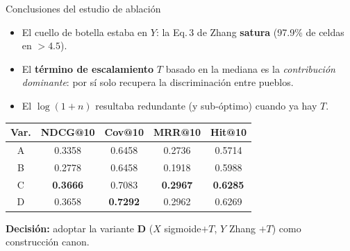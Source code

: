 \documentclass[aspectratio=169,11pt]{beamer}
\begin{document}
\begin{frame}{Conclusiones del estudio de ablaci\'on}
	\small
	\begin{itemize}\setlength\itemsep{4pt}
		\item El cuello de botella estaba en $Y$: la Eq.\,3 de Zhang \textbf{satura} (97.9\% de celdas en $\!>\!4.5$).
		\item El \textbf{t\'ermino de escalamiento} $T$ basado en la mediana es la \emph{contribuci\'on dominante}: por s\'i solo recupera la discriminaci\'on entre pueblos.
		\item El $\log(1+n)$ resultaba redundante (y sub-\'optimo) cuando ya hay $T$.
	\end{itemize}

	\vspace{0.6em}
	\centering
	\renewcommand{\arraystretch}{1.1}
	\begin{tabular}{c c c c c}
		\toprule
		\textbf{Var.} & NDCG@10         & Cov@10          & MRR@10          & Hit@10          \\
		\midrule
		A             & 0.3358          & 0.6458          & 0.2736          & 0.5714          \\
		B             & 0.2778          & 0.6458          & 0.1918          & 0.5988          \\
		\rowcolor{cream!50}
		C             & \textbf{0.3666} & 0.7083          & \textbf{0.2967} & \textbf{0.6285} \\
		\rowcolor{cream!50}
		D             & 0.3658          & \textbf{0.7292} & 0.2962          & 0.6269          \\
		\bottomrule
	\end{tabular}

	\vspace{0.5em}
	\textbf{Decisi\'on:} adoptar la variante \textbf{D} ($X$ sigmoide$+T$, $Y$ Zhang $+T$) como construcci\'on canon.
\end{frame}
\end{document}
